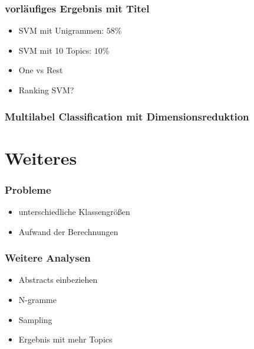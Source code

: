 \documentclass[12pt, xcolor=table]{beamer}
\begin{document}
\begin{frame}
    \frametitle{vorläufiges Ergebnis mit Titel}
    \begin{itemize}
        \item SVM mit Unigrammen: $58 \%$
        \item SVM mit 10 Topics: $10 \%$
        \item One vs Rest
        \item Ranking SVM?
    \end{itemize}
\end{frame}

\begin{frame}
    \frametitle{Multilabel Classification mit Dimensionsreduktion}
\end{frame}

\section{Weiteres} %
\label{sec:Weiteres}

\begin{frame}
    \frametitle{Probleme}
    \begin{itemize}
        \item unterschiedliche Klassengrößen
        \item Aufwand der Berechnungen
    \end{itemize}
\end{frame}

\begin{frame}
    \frametitle{Weitere Analysen}
    \begin{itemize}
        \item Abstracts einbeziehen
        \item N-gramme
        \item Sampling
        \item Ergebnis mit mehr Topics
    \end{itemize}
\end{frame}
\end{document}
